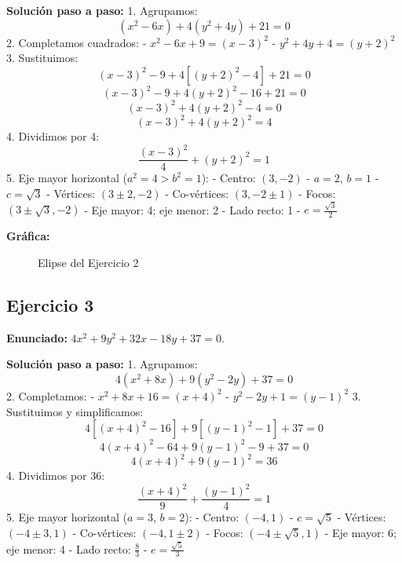 \documentclass[12pt,a4paper]{article}
\begin{document}
\textbf{Solución paso a paso:}
1. Agrupamos:
   \[
   (x^2 - 6x) + 4(y^2 + 4y) + 21 = 0
   \]
2. Completamos cuadrados:
   - \(x^2 - 6x + 9 = (x-3)^2\)
   - \(y^2 + 4y + 4 = (y+2)^2\)
3. Sustituimos:
   \[
   (x-3)^2 - 9 + 4[(y+2)^2 - 4] + 21 = 0
   \]
   \[
   (x-3)^2 - 9 + 4(y+2)^2 - 16 + 21 = 0
   \]
   \[
   (x-3)^2 + 4(y+2)^2 - 4 = 0
   \]
   \[
   (x-3)^2 + 4(y+2)^2 = 4
   \]
4. Dividimos por 4:
   \[
   \frac{(x-3)^2}{4} + (y+2)^2 = 1
   \]
5. Eje mayor horizontal (\(a^2=4 > b^2=1\)):
   - Centro: \((3, -2)\)
   - \(a=2\), \(b=1\)
   - \(c=\sqrt{3}\)
   - Vértices: \((3\pm2, -2)\)
   - Co-vértices: \((3, -2\pm1)\)
   - Focos: \((3\pm\sqrt{3}, -2)\)
   - Eje mayor: 4; eje menor: 2
   - Lado recto: 1
   - \(e = \frac{\sqrt{3}}{2}\)

\textbf{Gráfica:}
\begin{figure}[H]
\centering
{}
\caption{Elipse del Ejercicio 2}
\end{figure}
\newpage

\subsection{Ejercicio 3}
\textbf{Enunciado:} \(4x^2 + 9y^2 + 32x - 18y + 37 = 0\).

\textbf{Solución paso a paso:}
1. Agrupamos:
   \[
   4(x^2 + 8x) + 9(y^2 - 2y) + 37 = 0
   \]
2. Completamos:
   - \(x^2 + 8x + 16 = (x+4)^2\)
   - \(y^2 - 2y + 1 = (y-1)^2\)
3. Sustituimos y simplificamos:
   \[
   4[(x+4)^2 - 16] + 9[(y-1)^2 - 1] + 37 = 0
   \]
   \[
   4(x+4)^2 - 64 + 9(y-1)^2 - 9 + 37 = 0
   \]
   \[
   4(x+4)^2 + 9(y-1)^2 = 36
   \]
4. Dividimos por 36:
   \[
   \frac{(x+4)^2}{9} + \frac{(y-1)^2}{4} = 1
   \]
5. Eje mayor horizontal (\(a=3\), \(b=2\)):
   - Centro: \((-4, 1)\)
   - \(c = \sqrt{5}\)
   - Vértices: \((-4 \pm 3, 1)\)
   - Co-vértices: \((-4, 1 \pm 2)\)
   - Focos: \((-4 \pm \sqrt{5}, 1)\)
   - Eje mayor: 6; eje menor: 4
   - Lado recto: \(\frac{8}{3}\)
   - \(e = \frac{\sqrt{5}}{3}\)
\end{document}

